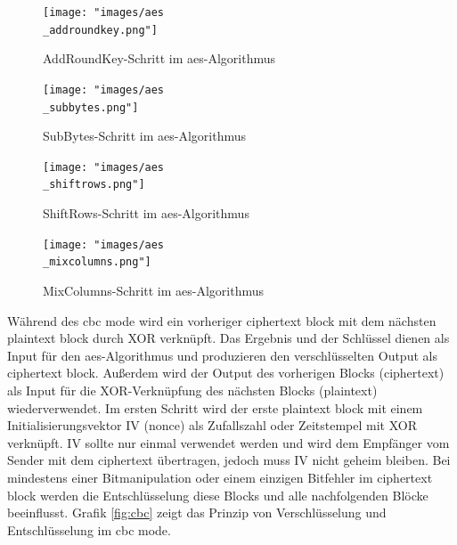 \begin{figure}[!htb]
	\centering
	\texttt{[image: "images/aes\\\_addroundkey.png"]}
	\caption{AddRoundKey-Schritt im \gls{aes}-Algorithmus \cite{wiki-aes}}
	\label{fig:aes-addk}
\end{figure}

\begin{figure}[!htb]
	\centering
	\texttt{[image: "images/aes\\\_subbytes.png"]}
	\caption{SubBytes-Schritt im \gls{aes}-Algorithmus \cite{wiki-aes}}
	\label{fig:aes-sub}
\end{figure}

\begin{figure}[!htb]
	\centering
	\texttt{[image: "images/aes\\\_shiftrows.png"]}
	\caption{ShiftRows-Schritt im \gls{aes}-Algorithmus \cite{wiki-aes}}
	\label{fig:aes-shift}
\end{figure}

\begin{figure}[!htb]
	\centering
	\texttt{[image: "images/aes\\\_mixcolumns.png"]}
	\caption{MixColumns-Schritt im \gls{aes}-Algorithmus \cite{wiki-aes}}
	\label{fig:aes-mix}
\end{figure}

Während des \gls{cbc} mode wird ein vorheriger ciphertext block mit dem nächsten plaintext block durch XOR verknüpft. Das Ergebnis und der Schlüssel dienen als Input für den \gls{aes}-Algorithmus und produzieren den verschlüsselten Output als ciphertext block. Außerdem wird der Output des vorherigen Blocks (ciphertext) als Input für die XOR-Verknüpfung des nächsten Blocks (plaintext) wiederverwendet. Im ersten Schritt wird der erste plaintext block mit einem Initialisierungsvektor IV (nonce) als Zufallszahl oder Zeitstempel mit XOR verknüpft. IV sollte nur einmal verwendet werden und wird dem Empfänger vom Sender mit dem ciphertext übertragen, jedoch muss IV nicht geheim bleiben. Bei mindestens einer Bitmanipulation oder einem einzigen Bitfehler im ciphertext block werden die Entschlüsselung diese Blocks und alle nachfolgenden Blöcke beeinflusst. Grafik \ref{fig:cbc} zeigt das Prinzip von Verschlüsselung und Entschlüsselung im \gls{cbc} mode. \\

